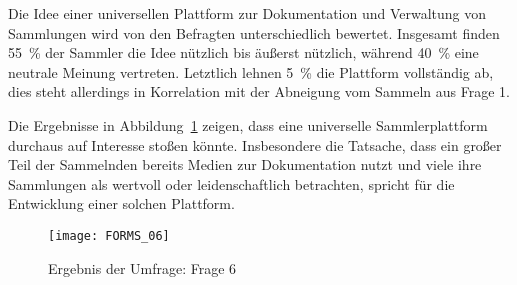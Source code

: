 \newpage

Die Idee einer universellen Plattform zur Dokumentation und Verwaltung von Sammlungen wird von den Befragten unterschiedlich bewertet.
Insgesamt finden 55~\% der Sammler die Idee nützlich bis äußerst nützlich, während 40~\% eine neutrale Meinung vertreten.
Letztlich lehnen 5~\% die Plattform vollständig ab, dies steht allerdings in Korrelation mit der Abneigung vom Sammeln aus Frage 1.

Die Ergebnisse in Abbildung~\ref{fig:forms_result_06} zeigen, dass eine universelle Sammlerplattform durchaus auf Interesse stoßen könnte.
Insbesondere die Tatsache, dass ein großer Teil der Sammelnden bereits Medien zur Dokumentation nutzt und viele ihre Sammlungen als wertvoll oder leidenschaftlich betrachten, spricht für die Entwicklung einer solchen Plattform.

\begin{figure}[h!]
    \centering
    \texttt{[image: FORMS\_06]}
    \caption{Ergebnis der Umfrage: Frage 6}
    \label{fig:forms_result_06}
\end{figure}

